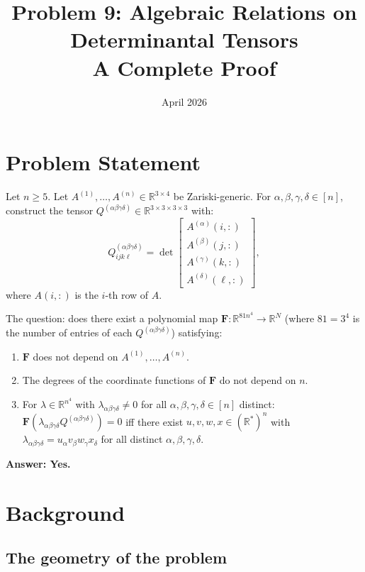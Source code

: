 \documentclass[12pt]{article}
\title{Problem 9: Algebraic Relations on Determinantal Tensors\\
\large A Complete Proof}
\author{}
\date{April 2026}
\begin{document}
\maketitle

\section{Problem Statement}

Let $n \geq 5$. Let $A^{(1)}, \ldots, A^{(n)} \in \mathbb{R}^{3 \times 4}$ be Zariski-generic. For $\alpha, \beta, \gamma, \delta \in [n]$, construct the tensor $Q^{(\alpha\beta\gamma\delta)} \in \mathbb{R}^{3 \times 3 \times 3 \times 3}$ with:
\[
Q^{(\alpha\beta\gamma\delta)}_{ijk\ell} = \det\begin{bmatrix} A^{(\alpha)}(i,:) \\ A^{(\beta)}(j,:) \\ A^{(\gamma)}(k,:) \\ A^{(\delta)}(\ell,:) \end{bmatrix},
\]
where $A(i,:)$ is the $i$-th row of $A$.

The question: does there exist a polynomial map $\mathbf{F}: \mathbb{R}^{81n^4} \to \mathbb{R}^N$ (where $81 = 3^4$ is the number of entries of each $Q^{(\alpha\beta\gamma\delta)}$) satisfying:
\begin{enumerate}
\item[(P1)] $\mathbf{F}$ does not depend on $A^{(1)}, \ldots, A^{(n)}$.
\item[(P2)] The degrees of the coordinate functions of $\mathbf{F}$ do not depend on $n$.
\item[(P3)] For $\lambda \in \mathbb{R}^{n^4}$ with $\lambda_{\alpha\beta\gamma\delta} \neq 0$ for all $\alpha,\beta,\gamma,\delta \in [n]$ distinct: $\mathbf{F}(\lambda_{\alpha\beta\gamma\delta} Q^{(\alpha\beta\gamma\delta)}) = 0$ iff there exist $u,v,w,x \in (\mathbb{R}^*)^n$ with $\lambda_{\alpha\beta\gamma\delta} = u_\alpha v_\beta w_\gamma x_\delta$ for all distinct $\alpha,\beta,\gamma,\delta$.
\end{enumerate}

\textbf{Answer: Yes.}

\section{Background}

\subsection{The geometry of the problem}
\end{document}
